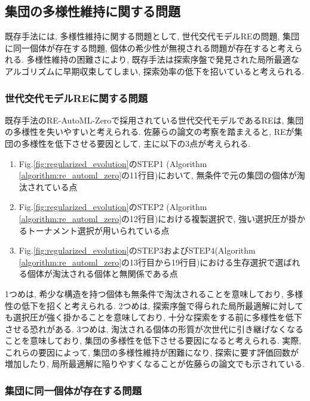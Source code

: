 \documentclass[11pt,oneside,openany,report]{jsbook}
\begin{document}
\subsection{集団の多様性維持に関する問題}\label{subsec:problem:existing_problem:diversity}

既存手法には, 多様性維持に関する問題として, 世代交代モデルREの問題, 集団に同一個体が存在する問題, 個体の希少性が無視される問題が存在すると考えられる. 多様性維持の困難さにより, 既存手法は探索序盤で発見された局所最適なアルゴリズムに早期収束してしまい, 探索効率の低下を招いていると考えられる.

\subsubsection{世代交代モデルREに関する問題}

既存手法のRE-AutoML-Zeroで採用されている世代交代モデルであるREは, 集団の多様性を失いやすいと考えられる. 佐藤らの論文\cite{mgg}の考察を踏まえると, REが集団の多様性を低下させる要因として, 主に以下の3点が考えられる.

\begin{enumerate}
  \item Fig.\ref{fig:regularized_evolution}のSTEP1 (Algorithm \ref{algorithm:re_automl_zero}の11行目)において, 無条件で元の集団の個体が淘汰されている点
  \item Fig.\ref{fig:regularized_evolution}のSTEP2 (Algorithm \ref{algorithm:re_automl_zero}の12行目)における複製選択で, 強い選択圧が掛かるトーナメント選択が用いられている点
  \item Fig.\ref{fig:regularized_evolution}のSTEP3およびSTEP4(Algorithm \ref{algorithm:re_automl_zero}の13行目から19行目)における生存選択で選ばれる個体が淘汰される個体と無関係である点
\end{enumerate}

\noindent
1つめは, 希少な構造を持つ個体も無条件で淘汰されることを意味しており, 多様性の低下を招くと考えられる. 2つめは, 探索序盤で得られた局所最適解に対しても選択圧が強く掛かることを意味しており, 十分な探索をする前に多様性を低下させる恐れがある. 3つめは, 淘汰される個体の形質が次世代に引き継げなくなることを意味しており, 集団の多様性を低下させる要因になると考えられる. 実際, これらの要因によって, 集団の多様性維持が困難になり, 探索に要す評価回数が増加したり, 局所最適解に陥りやすくなることが佐藤らの論文\cite{mgg}でも示されている.

\subsubsection{集団に同一個体が存在する問題}
\end{document}

